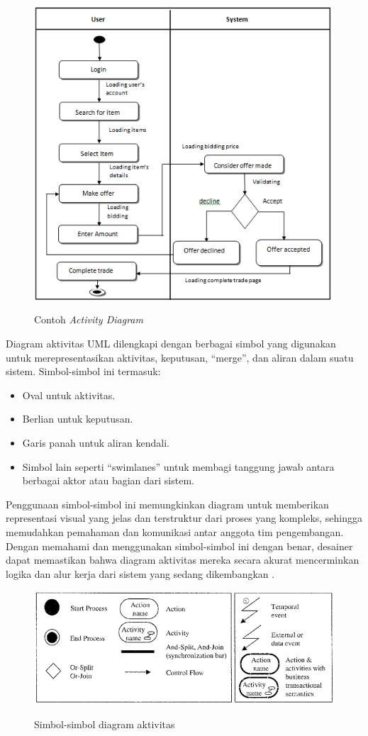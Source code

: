 \begin{figure}[htbp]
  \centering
  \includegraphics[width=0.85\linewidth]{images/bab-2/act.png}
  \caption{Contoh \emph{Activity Diagram}}\label{fig:activity-diagram-example}\citep{jibrilActivityDiagram}
\end{figure}

Diagram aktivitas UML dilengkapi dengan berbagai simbol yang digunakan untuk merepresentasikan aktivitas, keputusan, ``merge'', dan aliran dalam suatu sistem. Simbol-simbol ini termasuk:
\begin{itemize}
  \item Oval untuk aktivitas.
  \item Berlian untuk keputusan.
  \item Garis panah untuk aliran kendali.
  \item Simbol lain seperti ``swimlanes'' untuk membagi tanggung jawab antara berbagai aktor atau bagian dari sistem.
\end{itemize}
Penggunaan simbol-simbol ini memungkinkan diagram untuk memberikan representasi visual yang jelas dan terstruktur dari proses yang kompleks, sehingga memudahkan pemahaman dan komunikasi antar anggota tim pengembangan. Dengan memahami dan menggunakan simbol-simbol ini dengan benar, desainer dapat memastikan bahwa diagram aktivitas mereka secara akurat mencerminkan logika dan alur kerja dari sistem yang sedang dikembangkan \citep{Casati2002}.

\begin{figure}[htbp]
  \centering
  \includegraphics[width=0.85\linewidth]{images/bab-2/act-symbols.png}
  \caption{Simbol-simbol diagram aktivitas}\label{fig:activity-diagram-symbols}\citep{Casati2002}
\end{figure}

